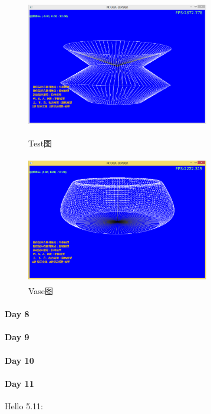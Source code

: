 \documentclass[UTF8,a4paper,8pt]{ctexbook}
\begin{document}
	 		\begin{figure}
	 			\begin{center}
	 				\begin{minipage}[H]{0.5\textwidth}
	 					\centering
	 					\includegraphics[angle=0,width=8cm,height=5.6cm]{DirectX-Rotation.png}%
	 					\caption{Test图}
	 					\label{fig:winClass}
	 				\end{minipage}%
	 				\begin{minipage}[H]{0.5\textwidth} 
	 					\centering
	 					\includegraphics[angle=0,width=8cm,height=5.6cm]{Vase.png}
	 					\caption{Vase图 }
	 					\label{fig:createWindow}
	 				\end{minipage}
	 			\end{center}
	 		\end{figure} 	
		 	 
 	 \paragraph{Day 8       \quad     }
 	 \paragraph{Day 9       \quad     }
 	 \paragraph{Day 10      \quad     }
 	 \paragraph{Day 11      \quad     }
	 	 Hello  5.11:
	 	 
\end{document}
